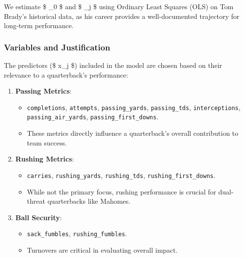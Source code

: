 \documentclass[
  letterpaper,
  DIV=11,
  numbers=noendperiod]{scrartcl}
\providecommand{\tightlist}{%
  \setlength{\itemsep}{0pt}\setlength{\parskip}{0pt}}\usepackage{longtable,booktabs,array}
\begin{document}
We estimate \$ \beta\_0 \$ and \$ \beta\_j \$ using Ordinary Least
Squares (OLS) on Tom Brady's historical data, as his career provides a
well-documented trajectory for long-term performance.

\subsubsection{Variables and
Justification}\label{variables-and-justification}

The predictors (\$ x\_j \$) included in the model are chosen based on
their relevance to a quarterback's performance:

\begin{enumerate}
\def\labelenumi{\arabic{enumi}.}
\tightlist
\item
  \textbf{Passing Metrics}:

  \begin{itemize}
  \tightlist
  \item
    \texttt{completions}, \texttt{attempts}, \texttt{passing\_yards},
    \texttt{passing\_tds}, \texttt{interceptions},
    \texttt{passing\_air\_yards}, \texttt{passing\_first\_downs}.\\
  \item
    These metrics directly influence a quarterback's overall
    contribution to team success.
  \end{itemize}
\item
  \textbf{Rushing Metrics}:

  \begin{itemize}
  \tightlist
  \item
    \texttt{carries}, \texttt{rushing\_yards}, \texttt{rushing\_tds},
    \texttt{rushing\_first\_downs}.\\
  \item
    While not the primary focus, rushing performance is crucial for
    dual-threat quarterbacks like Mahomes.
  \end{itemize}
\item
  \textbf{Ball Security}:

  \begin{itemize}
  \tightlist
  \item
    \texttt{sack\_fumbles}, \texttt{rushing\_fumbles}.\\
  \item
    Turnovers are critical in evaluating overall impact.
  \end{itemize}
\end{enumerate}
\end{document}
